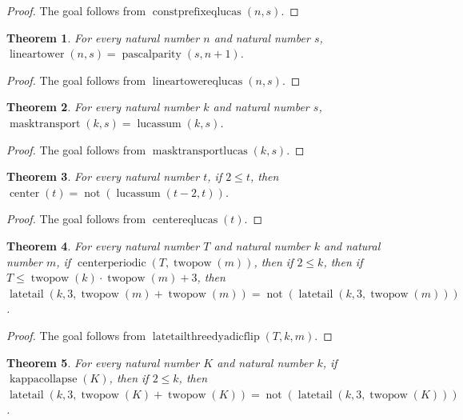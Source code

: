 \documentclass[11pt]{article}
\newtheorem{theorem}{Theorem}[section]
\theoremstyle{definition}
\begin{document}
\begin{proof}
The goal follows from \(\operatorname{constprefixeqlucas}(n, s)\).
\end{proof}
\begin{theorem}
\label{ll:observations:linear-tower-eq-lucas}
For every natural number \(n\) and natural number \(s\), \(\operatorname{lineartower}(n, s) = \operatorname{pascalparity}(s, n + 1)\).
\end{theorem}
\begin{proof}
The goal follows from \(\operatorname{lineartowereqlucas}(n, s)\).
\end{proof}
\begin{theorem}
\label{ll:observations:mask-transport-lucas}
For every natural number \(k\) and natural number \(s\), \(\operatorname{masktransport}(k, s) = \operatorname{lucassum}(k, s)\).
\end{theorem}
\begin{proof}
The goal follows from \(\operatorname{masktransportlucas}(k, s)\).
\end{proof}
\begin{theorem}
\label{ll:observations:center-eq-lucas}
For every natural number \(t\), if \(2 \le t\), then \(\operatorname{center}(t) = \operatorname{not}(\operatorname{lucassum}(t - 2, t))\).
\end{theorem}
\begin{proof}
The goal follows from \(\operatorname{centereqlucas}(t)\).
\end{proof}
\begin{theorem}
\label{ll:observations:late-tail-three-dyadic-flip}
For every natural number \(T\) and natural number \(k\) and natural number \(m\), if \(\operatorname{centerperiodic}(T, \operatorname{twopow}(m))\), then if \(2 \le k\), then if \(T \le \operatorname{twopow}(k) \cdot \operatorname{twopow}(m) + 3\), then \(\operatorname{latetail}(k, 3, \operatorname{twopow}(m) + \operatorname{twopow}(m)) = \operatorname{not}(\operatorname{latetail}(k, 3, \operatorname{twopow}(m)))\).
\end{theorem}
\begin{proof}
The goal follows from \(\operatorname{latetailthreedyadicflip}(T, k, m)\).
\end{proof}
\begin{theorem}
\label{ll:observations:kappa-collapse-late-tail-flip}
For every natural number \(K\) and natural number \(k\), if \(\operatorname{kappacollapse}(K)\), then if \(2 \le k\), then \(\operatorname{latetail}(k, 3, \operatorname{twopow}(K) + \operatorname{twopow}(K)) = \operatorname{not}(\operatorname{latetail}(k, 3, \operatorname{twopow}(K)))\).
\end{theorem}
\end{document}
